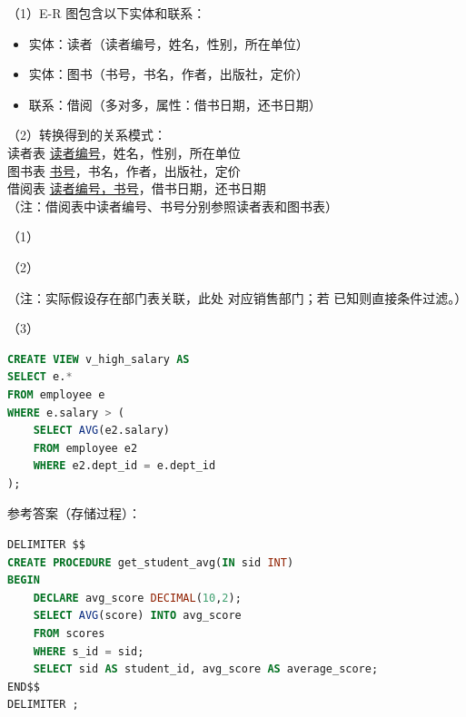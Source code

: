\documentclass[a4paper,11pt]{article}
\begin{document}

\q （1）E-R 图包含以下实体和联系：
\begin{itemize}
  \item 实体：读者（读者编号，姓名，性别，所在单位）
  \item 实体：图书（书号，书名，作者，出版社，定价）
  \item 联系：借阅（多对多，属性：借书日期，还书日期）
\end{itemize}

\par（2）转换得到的关系模式：\\
读者表 \underline{读者编号}，姓名，性别，所在单位\\
图书表 \underline{书号}，书名，作者，出版社，定价\\
借阅表 \underline{读者编号，书号}，借书日期，还书日期\\
（注：借阅表中读者编号、书号分别参照读者表和图书表）


\q
\par （1）
\par （2）\par
（注：实际假设存在部门表关联，此处  对应销售部门；若  已知则直接条件过滤。）

\par （3）
\begin{lstlisting}[language=SQL]
CREATE VIEW v_high_salary AS
SELECT e.*
FROM employee e
WHERE e.salary > (
    SELECT AVG(e2.salary)
    FROM employee e2
    WHERE e2.dept_id = e.dept_id
);
\end{lstlisting}

\q 参考答案（存储过程）：
\begin{lstlisting}[language=SQL]
DELIMITER $$
CREATE PROCEDURE get_student_avg(IN sid INT)
BEGIN
    DECLARE avg_score DECIMAL(10,2);
    SELECT AVG(score) INTO avg_score
    FROM scores
    WHERE s_id = sid;
    SELECT sid AS student_id, avg_score AS average_score;
END$$
DELIMITER ;
\end{lstlisting}
\end{document}
